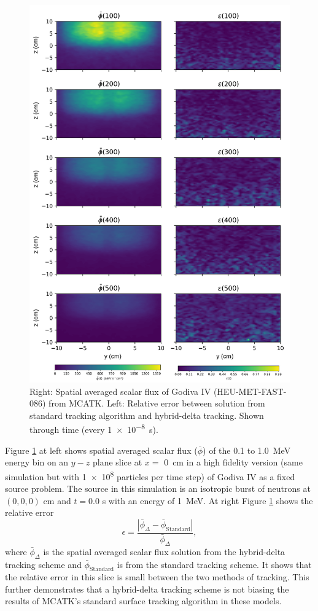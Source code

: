 \begin{figure}[!p]
  \centering
  \includegraphics[width=.8\textwidth]{appendix/mcatk_figures/godiva_plot.png}
  \caption{Right: Spatial averaged scalar flux of Godiva IV (HEU-MET-FAST-086) from MCATK. Left: Relative error between solution from standard tracking algorithm and hybrid-delta tracking. Shown through time (every \SI{1e-8}{\s}).}
  \label{fig:godiva_results}
\end{figure}


Figure \ref{fig:godiva_results} at left shows spatial averaged scalar flux ($\bar{\phi}$) of the \num{0.1} to \SI{1.0}{\mega\electronvolt} energy bin on an $y-z$ plane slice at $x=$ \SI{0}{\centi\meter} in a high fidelity version (same simulation but with \num{1e8} particles per time step) of Godiva IV as a fixed source problem. The source in this simulation is an isotropic burst of neutrons at $(0,0,0)$ \unit{\centi\meter} and $t=0.0$ \unit{\s} with an energy of \SI{1}{\mega\electronvolt}.
At right Figure \ref{fig:godiva_results} shows the relative error
\begin{equation}
    \epsilon = \frac{\left|\bar{\phi}_{\Delta} - \bar{\phi}_{\text{Standard}}\right|}{\bar{\phi}_{\Delta}},
\end{equation}
where $\bar{\phi}_{\Delta}$ is the spatial averaged scalar flux solution from the hybrid-delta tracking scheme and $\bar{\phi}_{\text{Standard}}$ is from the standard tracking scheme.
It shows that the relative error in this slice is small between the two methods of tracking.
This further demonstrates that a hybrid-delta tracking scheme is not biasing the results of MCATK's standard surface tracking algorithm in these models. 


